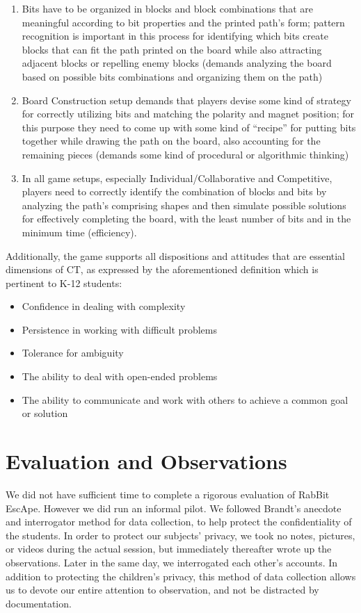 \documentclass{acm_proc_article-sp}
\begin{document}
\begin{enumerate}
\item{Bits have to be organized in blocks and block combinations that are meaningful according to bit properties and the printed path's form; pattern recognition is important in this process for identifying which bits create blocks that can fit the path printed on the board while also attracting adjacent blocks or repelling enemy blocks (demands analyzing the board based on possible bits combinations and organizing them on the path)}
\item{Board Construction setup demands that players devise some kind of strategy for correctly utilizing bits and matching the polarity and magnet position; for this purpose they need to come up with some kind of ``recipe'' for putting bits together while drawing the path on the board, also accounting for the remaining pieces (demands some kind of procedural or algorithmic thinking)}
\item{In all game setups, especially Individual/Collaborative and Competitive, players need to correctly identify the combination of blocks and bits by analyzing the path's comprising shapes and then simulate possible solutions for effectively completing the board, with the least number of bits and in the minimum time (efficiency).}
\end{enumerate}

Additionally, the game supports all dispositions and attitudes that are essential dimensions of CT, as expressed by the aforementioned definition which is pertinent to K-12 students:
\begin{itemize}
       \item Confidence in dealing with complexity
       \item Persistence in working with difficult problems
       \item Tolerance for ambiguity
       \item The ability to deal with open-ended problems
       \item The ability to communicate and work with others to achieve a common goal or solution
\end{itemize}

\section{Evaluation and Observations}
\label{sec:observations}
We did not have sufficient time to complete a rigorous evaluation of RabBit EscApe. 
However we did run an informal pilot. We followed Brandt's anecdote and interrogator method \cite{brandt1972studying} for data collection, to help protect the confidentiality of the students. 
In order to protect our subjects' privacy, we took no notes, pictures, or videos during the actual session, but immediately thereafter wrote up the observations.
Later in the same day, we interrogated each other's accounts. 
In addition to protecting the children's privacy, this method of data collection allows us to devote our entire attention to observation, and not be distracted by documentation.
\end{document}
